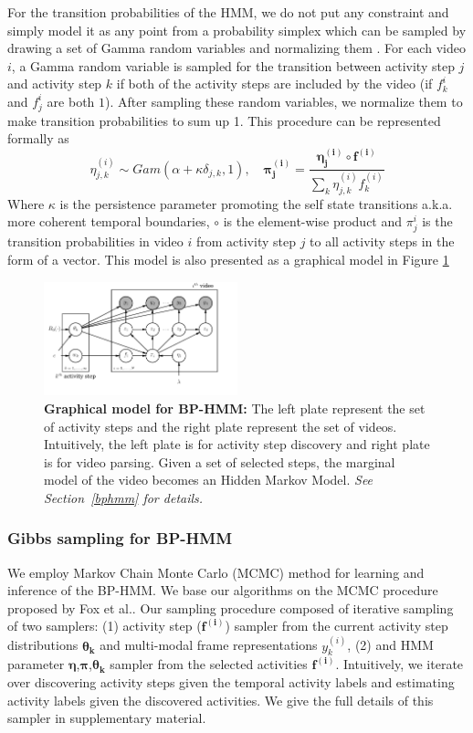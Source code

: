 For the transition probabilities of the HMM, we do not put any constraint and simply model it as any point from a probability simplex which can be sampled by drawing a set of Gamma random variables and normalizing them \cite{foxBPHMM}. For each video $i$, a Gamma random variable is sampled for the transition between activity step $j$ and activity step $k$ if both of the activity steps are included by the video (\ie if $f^i_k$ and $f^i_j$ are both $1$). After sampling these random variables, we normalize them to make transition probabilities to sum up 1. This procedure can be represented formally as
\begin{equation}
  \eta_{j,k}^{(i)} \sim Gam(\alpha+\kappa \delta_{j,k},1), \quad \mathbf{\pi_j^{(i)}} = \frac{\mathbf{\eta^{(i)}_j} \circ \mathbf{f^{(i)}}}{\sum_k \eta^{(i)}_{j,k} f^{(i)}_k}
\end{equation}
Where $\kappa$ is the persistence parameter promoting the self state transitions a.k.a. more coherent temporal boundaries, $\circ$ is the element-wise product and $\pi^i_j$ is the transition probabilities in video $i$ from activity step $j$ to all activity steps in the form of a vector. This model is also presented as a graphical model in Figure \ref{bphmmo}
\begin{figure}[h!]
  \includegraphics[width=0.5\textwidth]{plate}
  \vspace{-8mm}
  \caption{\textbf{Graphical model for BP-HMM:} The left plate represent the set of activity steps and the right plate represent the set of videos. Intuitively, the left plate is for activity step discovery and right plate is for video parsing. Given a set of selected steps, the marginal model of the video becomes an Hidden Markov Model. \emph{See Section~\ref{bphmm} for details.}}
  \label{bphmmo}
\end{figure}


\subsubsection{Gibbs sampling for BP-HMM}
We employ Markov Chain Monte Carlo (MCMC) method for learning and inference of the BP-HMM. We base our algorithms on the MCMC procedure proposed by Fox et al.\cite{foxBPHMM}. Our sampling procedure composed of iterative sampling of two samplers: (1) activity step ($\mathbf{f^{(i)}}$) sampler from the current activity step distributions $\mathbf{\theta_k}$ and multi-modal frame representations $y^{(i)}_k$, (2) and HMM parameter $\mathbf{\eta}$,$\mathbf{\pi}$,$\mathbf{\theta_k}$ sampler from the selected activities $\mathbf{f^{(i)}}$. Intuitively, we iterate over discovering activity steps given the temporal activity labels and estimating activity labels given the discovered activities. We give the full details of this sampler in supplementary material.